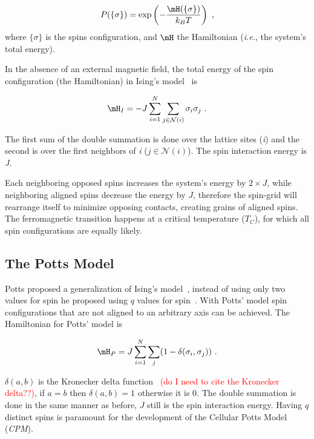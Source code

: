 \begin{equation}\label{eq:abm:boltzman-prob}
P(\{\sigma\}) = \exp\left(-\frac{\mH(\{\sigma\})}{k_B T}\right)\,\,,
\end{equation}
\noindent where $\{\sigma\}$ is the spins configuration, and $\mH$ the Hamiltonian (\textit{i.e.}, the system's total energy).

In the absence of an external magnetic field, the total energy of the spin configuration (the Hamiltonian) in Ising's model~\cite{ising1925beitrag} is

\begin{equation}\label{eq:abm:ising-hamiltonian}
\mH_I = -J\sum_{i=1}^{N}\sum_{j\in\mathcal{N}(i)} \sigma_i\sigma_j\,\,.
\end{equation}

\noindent The first sum of the double summation is done over the lattice sites (\textit{i}) and the second is over the first neighbors of \textit{i} ($j\in\mathcal{N}(i)$). The spin interaction energy is \textit{J}.

Each neighboring opposed spins increases the system's energy by $2 \times J$, while neighboring aligned spins decrease the energy by $J$, therefore the spin-grid will rearrange itself to minimize opposing contacts, creating grains of aligned spins. The ferromagnetic transition happens at a critical temperature ($T_C$), for which all spin configurations are equally likely.

\subsection{The Potts Model}\label{sec:abm:cpm-history:potts}

Potts proposed a generalization of Ising's model~\cite{potts1952some}, instead of using only two values for spin he proposed using $q$ values for spin~\cite{potts1952some}. With Potts' model spin configurations that are not aligned to an arbitrary axis can be achieved. The Hamiltonian for Potts' model is

\begin{equation}\label{eq:abm:potts-hamiltonian}
    \mH_P = J \sum_{i=1}^{N}\sum_{j} ( 1 - \delta(\sigma_i,\sigma_j))\,\,.
\end{equation}

\noindent $\delta(a, b)$ is the Kronecker delta function~\cite{} \textcolor{red}{(do I need to cite the Kronecker delta??)}, if $a=b$ then $\delta(a, b)=1$ otherwise it is 0. The double summation is done in the same manner as before, $J$ still is the spin interaction energy. Having $q$ distinct spins is paramount for the development of the Cellular Potts Model (\textit{CPM}).

